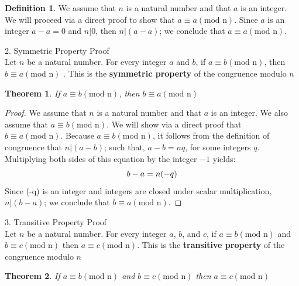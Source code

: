 \documentclass{book}
\newtheorem{theorem}{Theorem}[section]
\theoremstyle{definition}
\newtheorem{definition}{Definition}[section]
\theoremstyle{remark}
\begin{document}
\begin{definition}
We assume that $n$ is a natural number and that $a$ is an integer. We will proceed via a direct proof to show that $a \equiv a (\text{mod n})$. Since $a$ is an integer $a-a = 0$ and $n | 0$, then $n|(a-a)$; we conclude that $a \equiv a (\text{mod n})$.






2. Symmetric Property Proof \\
Let $n$ be a natural number. For every integer $a$ and $b$, if $a \equiv b (\text{mod n})$, then $b \equiv a (\text{mod n})$ . This is the {\bf symmetric  property} of the congruence modulo $n$

\begin{tcolorbox}
	\begin{theorem}
		If $a \equiv b (\text{mod n})$, then $b \equiv a (\text{mod n})$
	\end{theorem}
\end{tcolorbox}

\begin{proof}
We assume that $n$ is a natural number and that $a$ is an integer. We also assume that $a \equiv b (\text{mod n})$. We will show via a direct proof that $b \equiv a (\text{mod n})$. Because $a \equiv b (\text{mod n})$, it follows from the definition of congruence that $n|(a-b)$; such that, $a-b = nq$, for some integers $q$. Multiplying both sides of this equation by the integer $-1$ yields: 
	\begin{equation}
		b-a = n(-q) \nonumber \\
	\end{equation}
Since (-q) is an integer and integers are closed under scalar multiplication, $n | (b-a)$; we conclude that $b \equiv a (\text{mod n})$. 
\end{proof}



3. Transitive Property Proof \\ 
Let $n$ be a natural number. For every integer $a$, $b$, and $c$, if $a \equiv b (\text{mod n})$ and $b \equiv c (\text{mod n})$ then $a \equiv c (\text{mod n})$. This is the {\bf transitive property} of the congruence modulo $n$

\begin{tcolorbox}
	\begin{theorem}
		If $a \equiv b (\text{mod n})$ and $b \equiv c (\text{mod n})$ then $a \equiv c (\text{mod n})$
	\end{theorem}
\end{tcolorbox}


\end{definition}
\end{document}
